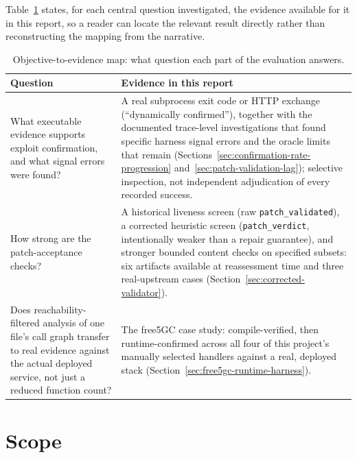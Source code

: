 \documentclass[12pt,a4paper]{report}
\begin{document}
Table~\ref{tab:objective-to-evidence} states, for each central question investigated, the evidence available for it in this report, so a reader can locate the relevant result directly rather than reconstructing the mapping from the narrative.

\begin{table}[H]
\centering
\caption{Objective-to-evidence map: what question each part of the evaluation answers.}
\label{tab:objective-to-evidence}
\begin{tabular}{@{}p{5.2cm}p{7.8cm}@{}}
\toprule
\textbf{Question} & \textbf{Evidence in this report} \\
\midrule
What executable evidence supports exploit confirmation, and what signal errors were found? & A real subprocess exit code or HTTP exchange (``dynamically confirmed''), together with the documented trace-level investigations that found specific harness signal errors and the oracle limits that remain (Sections~\ref{sec:confirmation-rate-progression} and~\ref{sec:patch-validation-lag}); selective inspection, not independent adjudication of every recorded success. \\
How strong are the patch-acceptance checks? & A historical liveness screen (raw \texttt{patch\_validated}), a corrected heuristic screen (\texttt{patch\_verdict}, intentionally weaker than a repair guarantee), and stronger bounded content checks on specified subsets: six artifacts available at reassessment time and three real-upstream cases (Section~\ref{sec:corrected-validator}). \\
Does reachability-filtered analysis of one file's call graph transfer to real evidence against the actual deployed service, not just a reduced function count? & The free5GC case study: compile-verified, then runtime-confirmed across all four of this project's manually selected handlers against a real, deployed stack (Section~\ref{sec:free5gc-runtime-harness}). \\
\bottomrule
\end{tabular}
\end{table}

\section{Scope}
\end{document}
